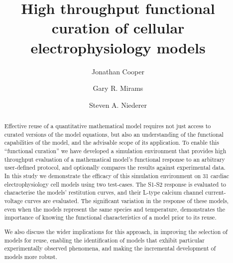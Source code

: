 \documentclass[preprint,authoryear,12pt]{elsarticle}
\begin{document}
\begin{frontmatter}
\title{High throughput functional curation of cellular electrophysiology models}
\author[oucl]{Jonathan Cooper}

\author[dpag]{Gary R. Mirams}

\author[kcl]{Steven A. Niederer}

\address[oucl]{Oxford University Computing Laboratory, University of Oxford, Oxford, UK}
\address[dpag]{Department of Physiology, Anatomy \& Genetics, University of Oxford, Oxford, UK}
\address[kcl]{Biomedical Engineering Department, Imaging Sciences \& Biomedical Engineering Division, King's College London, UK}

\begin{abstract}


Effective reuse of a quantitative mathematical model requires not just access to curated versions of the model equations, but also an understanding of the functional capabilities of the model, and the advisable scope of its application.
To enable this ``functional curation'' we have developed a simulation environment that provides high throughput evaluation of a mathematical model's functional response to an arbitrary user-defined protocol, and optionally compares the results against experimental data.
In this study we demonstrate the efficacy of this simulation environment on 31 cardiac electrophysiology cell models using two test-cases.
The S1-S2 response is evaluated to characterise the models' restitution curves,
and their L-type calcium channel current-voltage curves are evaluated.
The significant variation in the response of these models, even when the models represent the same species and temperature, demonstrates the importance of knowing the functional characteristics of a model prior to its reuse.

We also discuss the wider implications for this approach, in improving the selection of models for reuse, enabling the identification of models that exhibit particular experimentally observed phenomena, and making the incremental development of models more robust.
\end{abstract}


\end{frontmatter}
\end{document}
